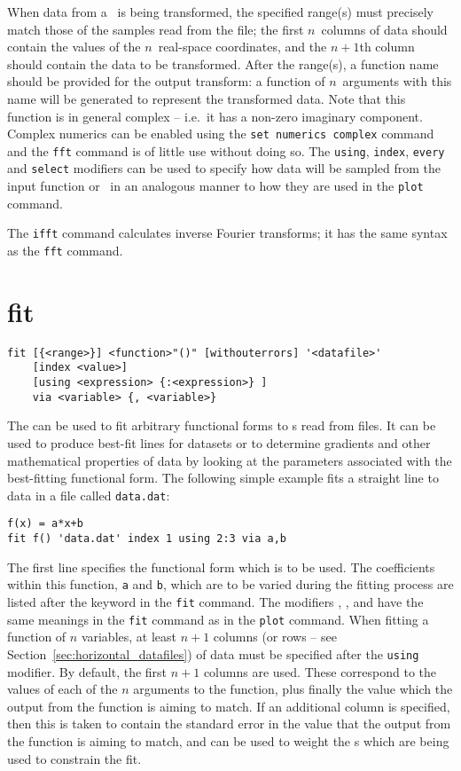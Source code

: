 When data from a \datafile\ is being transformed, the specified range(s) must
precisely match those of the samples read from the file; the first $n$~columns
of data should contain the values of the $n$~real-space coordinates, and the
$n+1$th column should contain the data to be transformed.  After the range(s),
a function name should be provided for the output transform: a function of
$n$~arguments with this name will be generated to represent the transformed
data.  Note that this function is in general complex -- i.e.\ it has a non-zero
imaginary component. Complex numerics can be enabled using the {\tt set
numerics complex} command and the {\tt fft} command is of little use without
doing so. The {\tt using}, {\tt index}, {\tt every} and {\tt select} modifiers
can be used to specify how data will be sampled from the input function or
\datafile\ in an analogous manner to how they are used in the {\tt plot}
command.

The {\tt ifft} command calculates inverse Fourier transforms; it has the same
syntax as the {\tt fft} command.

\section{fit}

\begin{verbatim}
fit [{<range>}] <function>"()" [withouterrors] '<datafile>'
    [index <value>]
    [using <expression> {:<expression>} ]
    via <variable> {, <variable>}
\end{verbatim}

The  can be used to fit arbitrary functional forms to \datapoint s
read from files. It can be used to produce best-fit lines for datasets or to
determine gradients and other mathematical properties of data by looking at the
parameters associated with the best-fitting functional form.  The following
simple example fits a straight line to data in a file called {\tt data.dat}:

\begin{verbatim}
f(x) = a*x+b
fit f() 'data.dat' index 1 using 2:3 via a,b
\end{verbatim}

\noindent The first line specifies the functional form which is to be used.
The coefficients within this function, {\tt a} and {\tt b}, which are to be
varied during the fitting process are listed after the keyword 
in the {\tt fit} command.  The modifiers , ,
 and  have the same meanings in the {\tt fit}
command as in the {\tt plot} command. When fitting a function of $n$
variables, at least $n+1$ columns (or rows -- see
Section~\ref{sec:horizontal_datafiles}) of data must be specified after the {\tt using}
modifier. By default, the first $n+1$ columns are used. These correspond to the
values of each of the $n$ arguments to the function, plus finally the value which
the output from the function is aiming to match.  If an additional column is
specified, then this is taken to contain the standard error in the value that
the output from the function is aiming to match, and can be used to weight the
\datapoint s which are being used to constrain the fit.

